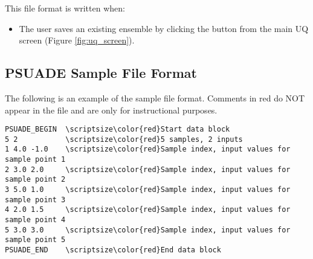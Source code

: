 This file format is written when:
\begin{itemize}
\item{The user saves an existing ensemble by clicking the  button from the main UQ screen (Figure \ref{fig:uq_screen}).}
\end{itemize}

\subsection{PSUADE Sample File Format}

The following is an example of the sample file format. Comments in red do NOT appear in the file and are only for instructional purposes.

\begin{Verbatim}[commandchars=\\\{\}]
PSUADE_BEGIN  \scriptsize\color{red}Start data block
5 2           \scriptsize\color{red}5 samples, 2 inputs
1 4.0 -1.0    \scriptsize\color{red}Sample index, input values for sample point 1
2 3.0 2.0     \scriptsize\color{red}Sample index, input values for sample point 2
3 5.0 1.0     \scriptsize\color{red}Sample index, input values for sample point 3
4 2.0 1.5     \scriptsize\color{red}Sample index, input values for sample point 4
5 3.0 3.0     \scriptsize\color{red}Sample index, input values for sample point 5
PSUADE_END    \scriptsize\color{red}End data block
\end{Verbatim}

